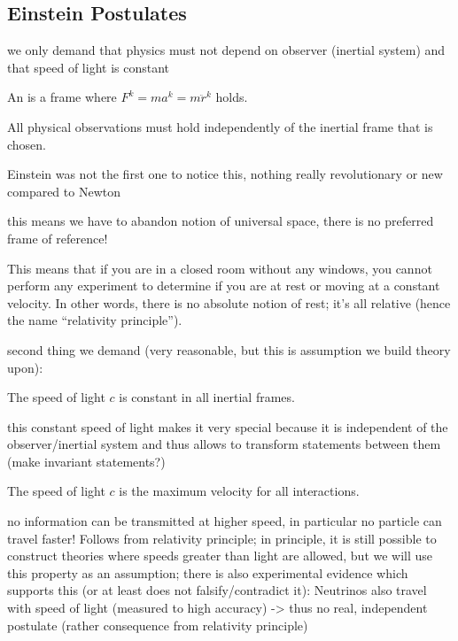 		\subsection{Einstein Postulates}


we only demand that physics must not depend on observer (inertial system) and that speed of light is constant

\begin{defi}
An  is a frame where $F^k = m a^k = m \ddot{r}^k$ holds.
\end{defi}


\begin{post}
All physical observations must hold independently of the inertial frame that is chosen.
\end{post}
Einstein was not the first one to notice this, nothing really revolutionary or new compared to Newton

this means we have to abandon notion of universal space, there is no preferred frame of reference!


This means that if you are in a closed room without any windows, you cannot perform any experiment to determine if you are at rest or moving at a constant velocity. In other words, there is no absolute notion of rest; it's all relative (hence the name \enquote{relativity principle}).



second thing we demand (very reasonable, but this is assumption we build theory upon):
\begin{post}[Relativity Principle]%
The speed of light $c$ is constant in all inertial frames.
\end{post}


this constant speed of light makes it very special because it is independent of the observer/inertial system and thus allows to transform statements between them (make invariant statements?)



\begin{prop}%
The speed of light $c$ is the maximum velocity for all interactions.
\end{prop}
no information can be transmitted at higher speed, in particular no particle can travel faster! Follows from relativity principle; in principle, it is still possible to construct theories where speeds greater than light are allowed, but we will use this property as an assumption; there is also experimental evidence which supports this (or at least does not falsify/contradict it): Neutrinos also travel with speed of light (measured to high accuracy) -> thus no real, independent postulate (rather consequence from relativity principle)





